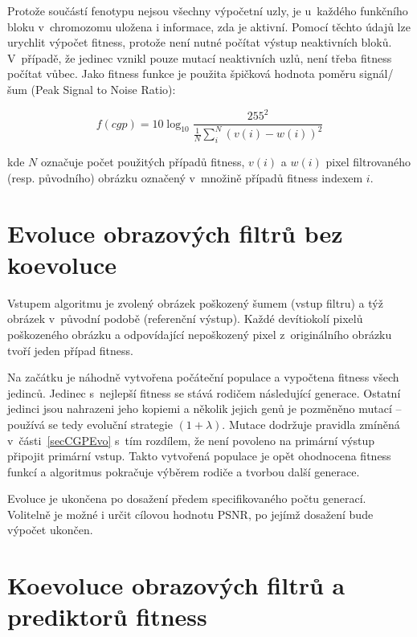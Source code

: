 Protože součástí fenotypu nejsou všechny výpočetní uzly, je u~každého funkčního bloku v~chromozomu uložena i informace, zda je aktivní. Pomocí těchto údajů lze urychlit výpočet fitness, protože není nutné počítat výstup neaktivních bloků. V~případě, že jedinec vznikl pouze mutací neaktivních uzlů, není třeba fitness počítat vůbec. Jako fitness funkce je použita špičková hodnota poměru signál/šum (Peak Signal to Noise Ratio):

\begin{equation}
    \label{eqDesignFilterFitness}
    \mathit{f\left(cgp\right)} = 10 \log_{10} \frac{255^2}{\frac{1}{N} \sum\limits_i^N \left( v\left( i \right) - w\left( i \right)  \right)^2 }
\end{equation}

\noindent{}kde $N$ označuje počet použitých případů fitness, $v(i)$ a $w(i)$ pixel filtrovaného (resp. původního) obrázku označený v~množině případů fitness indexem $i$.

\section{Evoluce obrazových filtrů bez koevoluce}
\label{secDesignEvoSimple}

Vstupem algoritmu je zvolený obrázek poškozený šumem (vstup filtru) a týž obrázek v~původní podobě (referenční výstup). Každé devítiokolí pixelů poškozeného obrázku a odpovídající nepoškozený pixel z~originálního obrázku tvoří jeden případ fitness.

Na začátku je náhodně vytvořena počáteční populace a vypočtena fitness všech jedinců. Jedinec s~nejlepší fitness se stává rodičem následující generace. Ostatní jedinci jsou nahrazeni jeho kopiemi a několik jejich genů je pozměněno mutací -- používá se tedy evoluční strategie $(1 + \lambda)$. Mutace dodržuje pravidla zmíněná v~části~\ref{secCGPEvo} s~tím rozdílem, že není povoleno na primární výstup připojit primární vstup. Takto vytvořená populace je opět ohodnocena fitness funkcí a algoritmus pokračuje výběrem rodiče a tvorbou další generace.

Evoluce je ukončena po dosažení předem specifikovaného počtu generací. Volitelně je možné i určit cílovou hodnotu PSNR, po jejímž dosažení bude výpočet ukončen.



\section{Koevoluce obrazových filtrů a prediktorů fitness}
\label{secDesignCoev}

